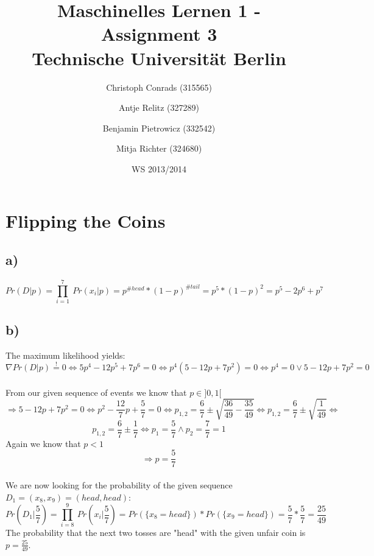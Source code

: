\documentclass[paper=a4,fontsize=10pt,DIV11,BCOR10mm]{scrartcl}
\begin{document}
\title{Maschinelles Lernen 1 - Assignment 3\\
\small{Technische Universität Berlin}}


\author{\small{Christoph Conrads (315565)}\and \small{Antje Relitz (327289)}  \and \small{Benjamin Pietrowicz (332542)} \and \small{Mitja Richter (324680)} }

\date{WS 2013/2014}

\maketitle

\section{Flipping the Coins}

\subsection*{a)}

\[ Pr (D|p) = \prod_{i=1}^7\ Pr(x_i|p) = p^{\# head} * (1-p)^{\# tail} = p^5 * (1-p)^2 = p^5 -2p^6 +p^7 \]



\subsection*{b)}
The maximum likelihood yields:
\[ \nabla Pr (D|p) \stackrel{!}{=} 0 \Leftrightarrow  5p^4 - 12 p^5 + 7p^6 = 0 \Leftrightarrow p^4(5-12p+7p^2) = 0 \Leftrightarrow p^4 = 0 \lor 5-12p+7p^2 = 0 \]\\
From our given sequence of events we know that $p\in ]0,1[$\\ 
\[\Rightarrow 5-12p+ 7p^2 = 0 \Leftrightarrow p^2 - \frac{12}{7}p + \frac{5}{7} = 0 \Leftrightarrow p_{1,2} = \frac{6}{7} \pm \sqrt{\frac{36}{49} - \frac{35}{49}} \Leftrightarrow p_{1,2} = \frac{6}{7} \pm \sqrt{\frac{1}{49}} \Leftrightarrow\]
\[ p_{1,2} = \frac{6}{7} \pm \frac{1}{7} \Leftrightarrow p_1 = \frac{5}{7} \land p_2 = \frac{7}{7} = 1\]
Again we know that $p<1$
\[ \Rightarrow p = \frac{5}{7} \]
\\We are now looking for the probability of the given sequence $D_1 = (x_8,x_9) = (head,head)$:
\[Pr(D_1|\frac{5}{7}) = \prod_{i=8}^9\ Pr(x_i|\frac{5}{7}) =Pr(\{x_8=head\})*Pr(\{x_9 = head\}) = \frac{5}{7} * \frac{5}{7} = \frac{25}{49} \]
The probability that the next two tosses are "head" with the given unfair coin is
$ p = \frac{25}{49}$.
\end{document}
